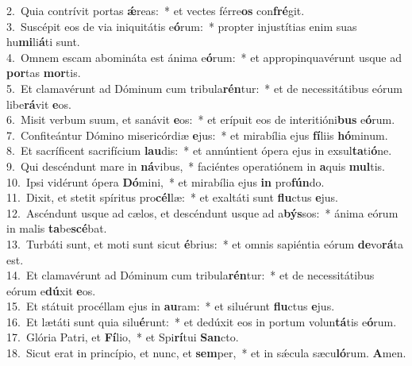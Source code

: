 {2.~}Quia contrívit portas \textbf{ǽ}reas:~* et vectes férre\textbf{os} con\textbf{fré}git.\\
{3.~}Suscépit eos de via iniquitátis e\textbf{ó}rum:~* propter injustítias enim suas hu\textbf{mi}li\textbf{á}ti sunt.\\
{4.~}Omnem escam abomináta est ánima e\textbf{ó}rum:~* et appropinquavérunt usque ad \textbf{por}tas \textbf{mor}tis.\\
{5.~}Et clamavérunt ad Dóminum cum tribula\textbf{rén}tur:~* et de necessitátibus eórum libe\textbf{rá}vit \textbf{e}os.\\
{6.~}Misit verbum suum, et sanávit \textbf{e}os:~* et erípuit eos de interitióni\textbf{bus} e\textbf{ó}rum.\\
{7.~}Confiteántur Dómino misericórdiæ \textbf{e}jus:~* et mirabília ejus \textbf{fí}liis \textbf{hó}minum.\\
{8.~}Et sacríficent sacrifícium \textbf{lau}dis:~* et annúntient ópera ejus in exsul\textbf{ta}ti\textbf{ó}ne.\\
{9.~}Qui descéndunt mare in \textbf{ná}vibus,~* faciéntes operatiónem in \textbf{a}quis \textbf{mul}tis.\\
{10.~}Ipsi vidérunt ópera \textbf{Dó}mini,~* et mirabília ejus \textbf{in} pro\textbf{fún}do.\\
{11.~}Dixit, et stetit spíritus pro\textbf{cél}læ:~* et exaltáti sunt \textbf{flu}ctus \textbf{e}jus.\\
{12.~}Ascéndunt usque ad cælos, et descéndunt usque ad a\textbf{býs}sos:~* ánima eórum in malis \textbf{ta}be\textbf{scé}bat.\\
{13.~}Turbáti sunt, et moti sunt sicut \textbf{é}brius:~* et omnis sapiéntia eórum \textbf{de}vo\textbf{rá}ta est.\\
{14.~}Et clamavérunt ad Dóminum cum tribula\textbf{rén}tur:~* et de necessitátibus eórum e\textbf{dú}xit \textbf{e}os.\\
{15.~}Et státuit procéllam ejus in \textbf{au}ram:~* et siluérunt \textbf{flu}ctus \textbf{e}jus.\\
{16.~}Et lætáti sunt quia silu\textbf{é}runt:~* et dedúxit eos in portum volun\textbf{tá}tis e\textbf{ó}rum.\\
{17.~}Glória Patri, et \textbf{Fí}lio,~* et Spi\textbf{rí}tui \textbf{San}cto.\\
{18.~}Sicut erat in princípio, et nunc, et \textbf{sem}per,~* et in sǽcula sæcu\textbf{ló}rum. \textbf{A}men.\\
